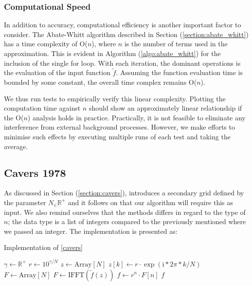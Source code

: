 \documentclass[a4paper]{report}
\begin{document}
\subsubsection{Computational Speed}\label{section:aw_speed}
In addition to accuracy, computational efficiency is another important factor to consider. The Abate-Whitt algorithm described in Section (\ref{section:abate_whitt}) has a time complexity of O($n$), where $n$ is the number of terms used in the approximation. This is evident in Algorithm (\ref{algo:abate_whitt}) for the inclusion of the single for loop. With each iteration, the dominant operations is the evaluation of the input function $\tilde{f}$. Assuming the function evaluation time is bounded by some constant, the overall time complex remains O($n$). 

We thus run tests to empirically verify this linear complexity. Plotting the computation time against $n$ should show an approximately linear relationship if the O($n$) analysis holds in practice. Practically, it is not feasible to eliminate any interference from external background processes. However, we make efforts to minimise such effects by executing multiple runs of each test and taking the average.

\subsection{Cavers 1978}
As discussed in Section (\ref{section:cavers}), \citet{Cavers1978FFT} introduces a secondary grid defined by the parameter $N_\in \mathbb{R}^+$ and it follows on that our algorithm will require this as input. We also remind ourselves that the methods differs in regard to the type of $n$; the data type is a list of integers compared to the previously mentioned where we passed an integer. The implementation is presented as:

\begin{algorithm}[H]
    \caption{Implementation of \autoref{cavers}}
    \label{algo:cavers}
    \begin{algorithmic}[1]
        	\State $\gamma \gets \mathbb{R}^+$
            \State $r \gets 10^{\gamma / N}$
            \State $z \gets \text{Array}[N]$
                \State $z[k] \gets r \cdot \exp(\text{i} * 2 \pi * k / N)$
            \EndFor
            \State $F \gets \text{Array}[N]$
            \State $F \gets \text{IFFT}(\tilde{f}(z))$
            \State $f \gets r^n \cdot F[n]$
            \State \Return $f$ 
        \EndProcedure
    \end{algorithmic}
\end{algorithm}
\end{document}

